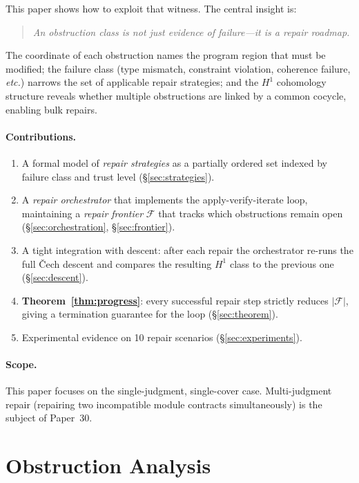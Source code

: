 \documentclass[11pt]{article}
\newcommand{\RF}{\mathcal{F}}               %
\newcommand{\hone}{H^1}                     %
\begin{document}
This paper shows how to exploit that witness.  The central insight is:
\begin{quote}
\emph{An obstruction class is not just evidence of failure---it is a
repair roadmap.}
\end{quote}
The coordinate of each obstruction names the program region that must be
modified; the failure class (type mismatch, constraint violation, coherence
failure, \emph{etc.}) narrows the set of applicable repair strategies; and
the $\hone$ cohomology structure reveals whether multiple obstructions are
linked by a common cocycle, enabling bulk repairs.

\paragraph{Contributions.}
\begin{enumerate}[leftmargin=2em,itemsep=2pt]
  \item A formal model of \emph{repair strategies} as a partially ordered set
        indexed by failure class and trust level (\S\ref{sec:strategies}).
  \item A \emph{repair orchestrator} that implements the
        apply-verify-iterate loop, maintaining a \emph{repair frontier}
        $\RF$ that tracks which obstructions remain open
        (\S\ref{sec:orchestration}, \S\ref{sec:frontier}).
  \item A tight integration with descent: after each repair the orchestrator
        re-runs the full Čech descent and compares the resulting $\hone$
        class to the previous one (\S\ref{sec:descent}).
  \item \textbf{Theorem~\ref{thm:progress}}: every successful repair step
        strictly reduces $|\RF|$, giving a termination guarantee for the loop
        (\S\ref{sec:theorem}).
  \item Experimental evidence on 10 repair scenarios
        (\S\ref{sec:experiments}).
\end{enumerate}

\paragraph{Scope.}
This paper focuses on the single-judgment, single-cover case.
Multi-judgment repair (\eg repairing two incompatible module contracts
simultaneously) is the subject of Paper~30.

\section{Obstruction Analysis}
\label{sec:obstruction-analysis}
\end{document}
